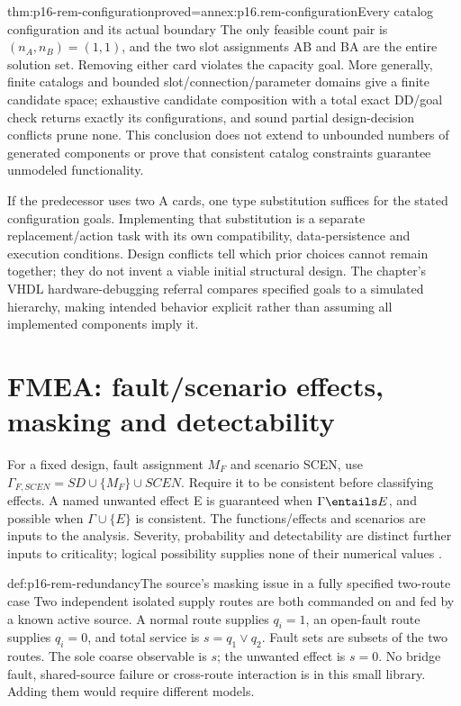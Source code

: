 \begin{hbtheorem}{thm:p16-rem-configuration}{proved=annex:p16.rem-configuration}{Every catalog configuration and its actual boundary}
The only feasible count pair is \((n_A,n_B)=(1,1)\), and the two slot
assignments AB and BA are the entire solution set. Removing either card
violates the capacity goal. More generally, finite catalogs and bounded
slot/connection/parameter domains give a finite candidate space; exhaustive
candidate composition with a total exact DD/goal check returns exactly
its configurations, and sound partial design-decision conflicts prune none.
This conclusion does not extend to unbounded numbers of generated components
or prove that consistent catalog constraints guarantee unmodeled functionality.
\end{hbtheorem}

If the predecessor uses two A cards, one type substitution suffices for
the stated configuration goals. Implementing that substitution is a separate
replacement/action task with its own compatibility, data-persistence and
execution conditions. Design conflicts tell which prior choices cannot
remain together; they do not invent a viable initial structural design.
The chapter's VHDL hardware-debugging referral compares specified goals to
a simulated hierarchy, making intended behavior explicit rather than
assuming all implemented components imply it.

\section{FMEA: fault/scenario effects, masking and detectability}
\label{sec:p16-rem-fmea}

For a fixed design, fault assignment \(M_F\) and scenario SCEN, use
\(\Gamma_{F,SCEN}=SD\cup\{M_F\}\cup SCEN\). Require it to
be consistent before classifying effects. A named unwanted effect E is
guaranteed when \(\Gamma\entails E\), and possible when
\(\Gamma\cup\{E\}\) is consistent. The functions/effects and
scenarios are inputs to the analysis. Severity, probability and detectability
are distinct further inputs to criticality; logical possibility supplies
none of their numerical values \cite[p.~456]{Struss2008ModelBasedProblemSolving}.

\begin{hbdefinition}{def:p16-rem-redundancy}{The source's masking issue in a fully specified two-route case}
Two independent isolated supply routes are both commanded on and fed by
a known active source. A normal route supplies \(q_i=1\), an open-fault
route supplies \(q_i=0\), and total service is
\(s=q_1\lor q_2\). Fault sets are subsets of the two routes.
The sole coarse observable is \(s\); the unwanted effect is \(s=0\).
No bridge fault, shared-source failure or cross-route interaction is in
this small library. Adding them would require different models.
\end{hbdefinition}

